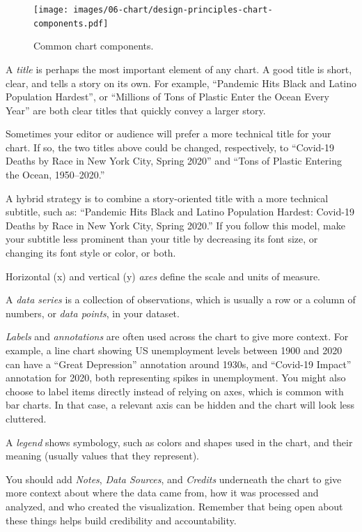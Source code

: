 \documentclass[
  english,
]{book}
\begin{document}
\begin{figure}
\centering
\texttt{[image: images/06-chart/design-principles-chart-components.pdf]}
\caption{\label{fig:design-principles-chart-components}Common chart components.}
\end{figure}

A \emph{title} is perhaps the most important element of any chart. A good title is short, clear,
and tells a story on its own. For example, ``Pandemic Hits Black and Latino Population Hardest'',
or ``Millions of Tons of Plastic Enter the Ocean Every Year'' are both clear titles that quickly convey a larger story.

Sometimes your editor or audience will prefer a more technical title for your chart. If so, the two titles above could be changed, respectively, to ``Covid-19 Deaths by Race in New York City, Spring 2020'' and ``Tons of Plastic Entering the Ocean, 1950--2020.''

A hybrid strategy is to combine a story-oriented title with a more technical subtitle, such as: ``Pandemic Hits Black and Latino Population Hardest: Covid-19 Deaths by Race in New York City, Spring 2020.'' If you follow this model, make your subtitle less prominent than your title by decreasing its font size, or changing its font style or color, or both.

Horizontal (x) and vertical (y) \emph{axes} define the scale and units of measure.

A \emph{data series} is a collection of observations, which is usually a row or
a column of numbers, or \emph{data points}, in your dataset.

\emph{Labels} and \emph{annotations} are often used across the chart to give more context. For example,
a line chart showing US unemployment levels between 1900 and 2020
can have a ``Great Depression'' annotation around 1930s, and ``Covid-19 Impact'' annotation for 2020,
both representing spikes in unemployment.
You might also choose to label items directly instead of relying on axes, which is common
with bar charts. In that case, a relevant axis can be hidden and the chart will look less cluttered.

A \emph{legend} shows symbology, such as colors and shapes used in the chart, and their meaning (usually values that they represent).

You should add \emph{Notes}, \emph{Data Sources}, and \emph{Credits} underneath the chart to give more context about
where the data came from, how it was processed and analyzed, and who created the visualization.
Remember that being open about these things helps build credibility and accountability.
\end{document}
